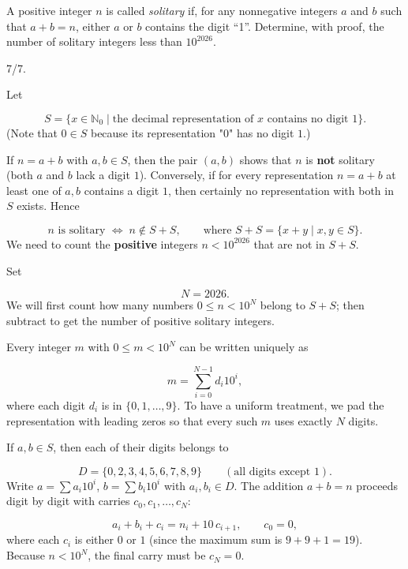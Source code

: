 \begin{mdframed}[style=mdpurplebox,frametitle={USAMO 2026 Problem 4}]
A positive integer $n$ is called \emph{solitary} if, for any nonnegative integers $a$ and $b$ such that $a + b = n$, either $a$ or $b$ contains the digit ``1''. Determine, with proof, the number of solitary integers less than $10^{2026}$.
\end{mdframed}
\begin{remark*}
  7/7.
\end{remark*}
Let\par
\[
S = \{ x \in \mathbb{N}_0 \mid \text{the decimal representation of } x \text{ contains no digit } 1\}.
\]
(Note that \(0\in S\) because its representation "0" has no digit \(1\).)\par
If \(n = a+b\) with \(a,b\in S\), then the pair \((a,b)\) shows that \(n\) is \textbf{not} solitary (both \(a\) and \(b\) lack a digit \(1\)). Conversely, if for every representation \(n = a+b\) at least one of \(a,b\) contains a digit \(1\), then certainly no representation with both in \(S\) exists. Hence\par
\[
n \text{ is solitary } \Longleftrightarrow \; n \notin S+S,
\qquad\text{where } S+S = \{ x+y \mid x,y\in S\}.
\]
We need to count the \textbf{positive} integers \(n < 10^{2026}\) that are not in \(S+S\).\par
Set\par
\[
N = 2026.
\]
We will first count how many numbers \(0 \le n < 10^N\) belong to \(S+S\); then subtract to get the number of positive solitary integers.\par
{}
Every integer \(m\) with \(0 \le m < 10^N\) can be written uniquely as\par
\[
m = \sum_{i=0}^{N-1} d_i 10^i,
\]
where each digit \(d_i\) is in \(\{0,1,\dots,9\}\). To have a uniform treatment, we pad the representation with leading zeros so that every such \(m\) uses exactly \(N\) digits.\par
If \(a,b\in S\), then each of their digits belongs to\par
\[
D = \{0,2,3,4,5,6,7,8,9\}\qquad(\text{all digits except }1).
\]
Write \(a = \sum a_i 10^i\), \(b = \sum b_i 10^i\) with \(a_i,b_i\in D\). The addition \(a+b = n\) proceeds digit by digit with carries \(c_0,c_1,\dots,c_N\):\par
\[
a_i + b_i + c_i = n_i + 10\,c_{i+1},\qquad c_0 = 0,
\]
where each \(c_i\) is either \(0\) or \(1\) (since the maximum sum is \(9+9+1 = 19\)). Because \(n < 10^N\), the final carry must be \(c_N = 0\).\par
